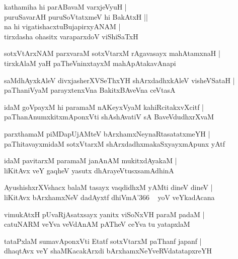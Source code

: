 \documentclass[twoside,12pt,openright]{book}
\newcounter{shloka}[chapter]
\begin{document}
\begin{shloka}%
kathamiha hi parABavaM varxjeVyuH |\\
puruSavarAH puruSoVtatxmeV hi BakAtxH ||\\
na hi vigatishacxtuBujapirxyANAM |\\
tirxdasha ohasitx varaparxdoV viShiSaTxH
\end{shloka}

\begin{shloka}%
sotxVtArxNAM parxvaraM sotxVtarxM rAgavasayx mahAtamxnaH |\\
tirxkAlaM yaH paTheVninxtayxM mahApAtakavAnapi
\end{shloka}

\begin{shloka}%
saMdhAyxkAleV divxjasherXVSeThxYH shArxdadhxkAleV visheVSataH |\\
paThaniVyaM parayxtenxVna BakitxBAveVna ceVtasA 
\end{shloka}

\begin{shloka}%
idaM goVpayxM hi paramaM nAKeyxVyaM kahiRcitakxvXcitf |\\
paThanAnumxkitxmAponxVti shAshAvatiV sA BaveVdudhxrXvaM 
\end{shloka}

\begin{shloka}%
parxthamaM piMDapUjAMteV bArxhamxNeynaRtasatatxmeYH |\\
paThitavayxmidaM sotxVtarxM shArxdadhxmakaSxyayxmApunx yAtf
\end{shloka}

\begin{shloka}%
idaM pavitarxM paramaM janAnAM mukitxdAyakaM |\\
liKitAvx veY gaqheV yasutx dhArayeVtusxsamAdhinA 
\end{shloka}

\begin{shloka}%
AyushishxrXVshacx balaM tasayx vaqdidhxM yAMti dineV dineV |\\
liKitAvx bArxhamxNeV dadAyxtf dhiVmA\char'366 ~ yoV veYkadAcana 
\end{shloka}

\begin{shloka}%
vimukAtxH pUvaRjAsatxsayx yanitx viSoNxVH paraM padaM |\\
catuNARM veYva veVdAnAM pATheV ceYva tu yatapxlaM 
\end{shloka}

\begin{shloka}%
tataPxlaM sumavAponxVti Etatf sotxVtarxM paThanf japanf |\\
dhaqtAvx veY shaMKacakArxdi bArxhamxNeYveRVdatatapxreYH 
\end{shloka}
\end{document}
